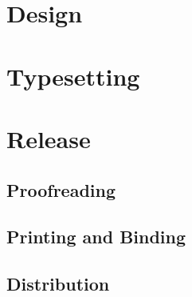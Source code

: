 \documentclass[a5paper,10pt]{book}
\begin{document}
\chapter{Design}
\chapter{Typesetting}
%
\chapter{Release}
\section{Proofreading}
\section{Printing and Binding}
\section{Distribution}
\backmatter

\printbibliography[heading=bibintoc]

\printacronyms[heading=none]

\cleardoublepage
\def\index#1{} %
\printindex    %
\end{document}
